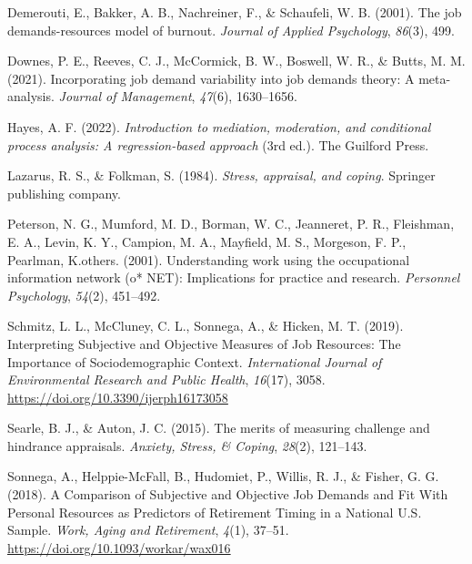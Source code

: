 \documentclass[
  man]{apa6}
\newlength{\cslhangindent}
\newlength{\cslentryspacingunit} %
\newenvironment{CSLReferences}[2] %
 {%
  \setlength{\parindent}{0pt}
  \ifodd #1
  \let\oldpar\par
  \def\par{\hangindent=\cslhangindent\oldpar}
  \fi
  \setlength{\parskip}{#2\cslentryspacingunit}
 }%
 {}
\begin{document}
\begin{CSLReferences}{1}{0}
\leavevmode{}%
Demerouti, E., Bakker, A. B., Nachreiner, F., \& Schaufeli, W. B. (2001). The job demands-resources model of burnout. \emph{Journal of Applied Psychology}, \emph{86}(3), 499.

\leavevmode{}%
Downes, P. E., Reeves, C. J., McCormick, B. W., Boswell, W. R., \& Butts, M. M. (2021). Incorporating job demand variability into job demands theory: A meta-analysis. \emph{Journal of Management}, \emph{47}(6), 1630--1656.

\leavevmode{}%
Hayes, A. F. (2022). \emph{Introduction to mediation, moderation, and conditional process analysis: A regression-based approach} (3rd ed.). The Guilford Press.

\leavevmode{}%
Lazarus, R. S., \& Folkman, S. (1984). \emph{Stress, appraisal, and coping}. Springer publishing company.

\leavevmode{}%
Peterson, N. G., Mumford, M. D., Borman, W. C., Jeanneret, P. R., Fleishman, E. A., Levin, K. Y., Campion, M. A., Mayfield, M. S., Morgeson, F. P., Pearlman, K.others. (2001). Understanding work using the occupational information network (o* NET): Implications for practice and research. \emph{Personnel Psychology}, \emph{54}(2), 451--492.

\leavevmode{}%
Schmitz, L. L., McCluney, C. L., Sonnega, A., \& Hicken, M. T. (2019). Interpreting {Subjective} and {Objective} {Measures} of {Job} {Resources}: {The} {Importance} of {Sociodemographic} {Context}. \emph{International Journal of Environmental Research and Public Health}, \emph{16}(17), 3058. \url{https://doi.org/10.3390/ijerph16173058}

\leavevmode{}%
Searle, B. J., \& Auton, J. C. (2015). The merits of measuring challenge and hindrance appraisals. \emph{Anxiety, Stress, \& Coping}, \emph{28}(2), 121--143.

\leavevmode{}%
Sonnega, A., Helppie-McFall, B., Hudomiet, P., Willis, R. J., \& Fisher, G. G. (2018). A {Comparison} of {Subjective} and {Objective} {Job} {Demands} and {Fit} {With} {Personal} {Resources} as {Predictors} of {Retirement} {Timing} in a {National} {U}.{S}. {Sample}. \emph{Work, Aging and Retirement}, \emph{4}(1), 37--51. \url{https://doi.org/10.1093/workar/wax016}


\end{CSLReferences}
\end{document}
